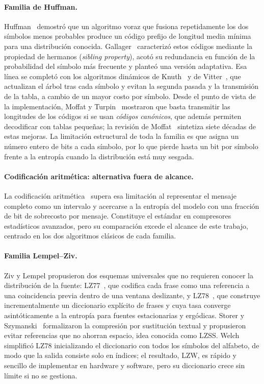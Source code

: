 \paragraph{Familia de Huffman.} Huffman~\cite{huffman1952} demostró que un algoritmo voraz que
fusiona repetidamente los dos símbolos menos probables produce un código prefijo de longitud
media mínima para una distribución conocida. Gallager~\cite{gallager1978} caracterizó estos
códigos mediante la propiedad de hermanos (\emph{sibling property}), acotó su redundancia en
función de la probabilidad del símbolo más frecuente y planteó una versión adaptativa. Esa
línea se completó con los algoritmos dinámicos de Knuth~\cite{knuth1985} y de
Vitter~\cite{vitter1987}, que actualizan el árbol tras cada símbolo y evitan la segunda pasada
y la transmisión de la tabla, a cambio de un mayor costo por símbolo. Desde el punto de vista
de la implementación, Moffat y Turpin~\cite{moffat1997} mostraron que basta transmitir las
longitudes de los códigos si se usan \emph{códigos canónicos}, que además permiten decodificar
con tablas pequeñas; la revisión de Moffat~\cite{moffat2019} sintetiza siete décadas de estas
mejoras. La limitación estructural de toda la familia es que asigna un número entero de bits a
cada símbolo, por lo que pierde hasta un bit por símbolo frente a la entropía cuando la
distribución está muy sesgada.

\paragraph{Codificación aritmética: alternativa fuera de alcance.} La codificación
aritmética~\cite{witten1987} supera esa limitación al representar el mensaje completo como un
intervalo y acercarse a la entropía del modelo con una fracción de bit de sobrecosto por
mensaje. Constituye el estándar en compresores estadísticos avanzados, pero su comparación
excede el alcance de este trabajo, centrado en los dos algoritmos clásicos de cada familia.

\paragraph{Familia Lempel--Ziv.} Ziv y Lempel propusieron dos esquemas universales que no
requieren conocer la distribución de la fuente: LZ77~\cite{ziv1977}, que codifica cada frase
como una referencia a una coincidencia previa dentro de una ventana deslizante, y
LZ78~\cite{ziv1978}, que construye incrementalmente un diccionario explícito de frases y cuya
tasa converge asintóticamente a la entropía para fuentes estacionarias y ergódicas. Storer y
Szymanski~\cite{storer1982} formalizaron la compresión por sustitución textual y propusieron
evitar referencias que no ahorran espacio, idea conocida como LZSS. Welch~\cite{welch1984}
simplificó LZ78 inicializando el diccionario con todos los símbolos del alfabeto, de modo que
la salida consiste solo en índices; el resultado, LZW, es rápido y sencillo de implementar
en hardware y software, pero su diccionario crece sin límite si no se gestiona.

